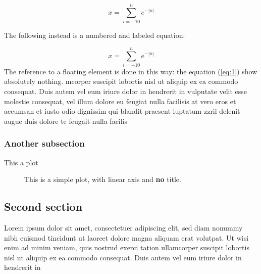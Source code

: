 \documentclass[a4paper, 10pt]{article}
\begin{document}
\[
x = \sum_{i=-10}^n e^{-|n|}
\]


The following instead is a numbered and labeled equation:

\begin{equation}
\label{eq:1}
x = \sum_{i=-10}^n e^{-|n|}
\end{equation}
The reference to a floating element is done in this way: the equation (\ref{eq:1}) show absolutely nothing.
mcorper suscipit lobortis nisl ut aliquip ex ea commodo consequat. Duis autem vel eum iriure dolor in hendrerit in
vulputate velit esse molestie consequat, vel illum dolore eu feugiat nulla facilisis at vero eros et
accumsan et iusto odio dignissim qui blandit praesent luptatum zzril delenit augue duis dolore te feugait nulla facilis


\subsubsection{Another subsection}

This a plot

\begin{figure}[ht!]
\begin{center}


\caption{This is a simple plot, with linear axis and {\bf no} title.}
\label{fig:plot}
\end{center}
\end{figure}

\subsection{Second section}

Lorem ipsum
dolor sit amet, consectetuer adipiscing elit, sed diam nonummy nibh euismod tincidunt ut
laoreet dolore magna aliquam erat volutpat. Ut wisi enim ad minim veniam, quis nostrud exerci tation
ullamcorper suscipit lobortis nisl ut aliquip ex ea commodo consequat. Duis autem vel eum iriure dolor in hendrerit in
\end{document}
